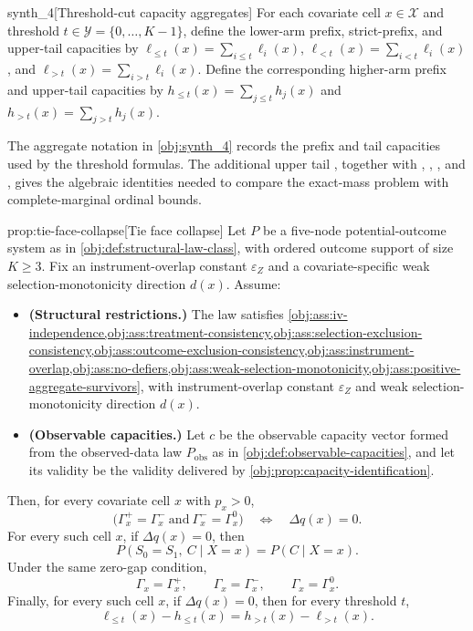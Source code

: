 \documentclass[11pt]{article}
\begin{document}
\begin{definitionv}{synth_4}[Threshold-cut capacity aggregates]
For each covariate cell $x\in\mathcal X$ and threshold $t\in\mathcal Y=\{0,\ldots,K-1\}$, define the lower-arm prefix, strict-prefix, and upper-tail capacities by $\ell_{\le t}(x)=\sum_{i\le t}\ell_i(x)$, $\ell_{<t}(x)=\sum_{i<t}\ell_i(x)$, and $\ell_{>t}(x)=\sum_{i>t}\ell_i(x)$. Define the corresponding higher-arm prefix and upper-tail capacities by $h_{\le t}(x)=\sum_{j\le t}h_j(x)$ and $h_{>t}(x)=\sum_{j>t}h_j(x)$.
\end{definitionv}

The aggregate notation in \cref{obj:synth_4} records the prefix and tail capacities used by the threshold formulas. The additional upper tail , together with , , , and , gives the algebraic identities needed to compare the exact-mass problem with complete-marginal ordinal bounds.

\begin{theoremv}{prop:tie-face-collapse}[Tie face collapse]
Let \(P\) be a five-node potential-outcome system as in \cref{obj:def:structural-law-class}, with ordered outcome support of size \(K\ge 3\). Fix an instrument-overlap constant \(\varepsilon_Z\) and a covariate-specific weak selection-monotonicity direction \(d(x)\). Assume:
\begin{itemize}
\item \textbf{(Structural restrictions.)} The law satisfies \cref{obj:ass:iv-independence,obj:ass:treatment-consistency,obj:ass:selection-exclusion-consistency,obj:ass:outcome-exclusion-consistency,obj:ass:instrument-overlap,obj:ass:no-defiers,obj:ass:weak-selection-monotonicity,obj:ass:positive-aggregate-survivors}, with instrument-overlap constant \(\varepsilon_Z\) and weak selection-monotonicity direction \(d(x)\).
\item \textbf{(Observable capacities.)} Let \(c\) be the observable capacity vector formed from the observed-data law \(P_{\mathrm{obs}}\) as in \cref{obj:def:observable-capacities}, and let its validity be the validity delivered by \cref{obj:prop:capacity-identification}.
\end{itemize}
Then, for every covariate cell \(x\) with \(p_x>0\),
\[
\bigl(\Gamma_x^{+}=\Gamma_x^{-}\ \text{and}\ \Gamma_x^{-}=\Gamma_x^{0}\bigr)
\quad\Longleftrightarrow\quad
\Delta q(x)=0 .
\]
For every such cell \(x\), if \(\Delta q(x)=0\), then
\[
P(S_0=S_1,\ C\mid X=x)=P(C\mid X=x).
\]
Under the same zero-gap condition,
\[
\Gamma_x=\Gamma_x^{+},
\qquad
\Gamma_x=\Gamma_x^{-},
\qquad
\Gamma_x=\Gamma_x^{0}.
\]
Finally, for every such cell \(x\), if \(\Delta q(x)=0\), then for every threshold \(t\),
\[
\ell_{\le t}(x)-h_{\le t}(x)=h_{>t}(x)-\ell_{>t}(x).
\]
\end{theoremv}
\end{document}
